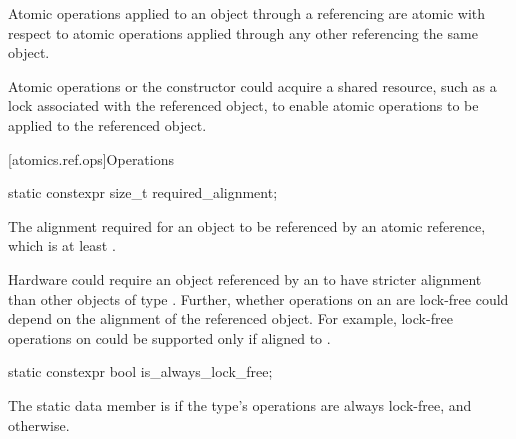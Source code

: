 \pnum
Atomic operations applied to an object
through a referencing  are atomic with respect to
atomic operations applied through any other 
referencing the same object.
\begin{note}
Atomic operations or the  constructor could acquire
a shared resource, such as a lock associated with the referenced object,
to enable atomic operations to be applied to the referenced object.
\end{note}

[atomics.ref.ops]{Operations}

%
%
%
%
\begin{itemdecl}
static constexpr size_t required_alignment;
\end{itemdecl}

\begin{itemdescr}
\pnum
The alignment required for an object to be referenced by an atomic reference,
which is at least .

\pnum
\begin{note}
Hardware could require an object
referenced by an 
to have stricter alignment
than other objects of type .
Further, whether operations on an 
are lock-free could depend on the alignment of the referenced object.
For example, lock-free operations on 
could be supported only if aligned to .
\end{note}
\end{itemdescr}

%
%
%
%
\begin{itemdecl}
static constexpr bool is_always_lock_free;
\end{itemdecl}

\begin{itemdescr}
\pnum
The static data member  is 
if the  type's operations are always lock-free,
and  otherwise.
\end{itemdescr}

